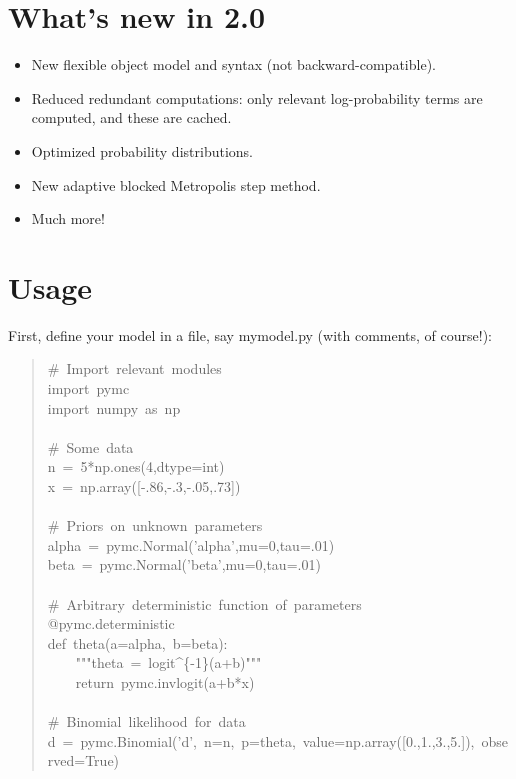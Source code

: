 
\hypertarget{what-s-new-in-2-0}{}
\section{What's new in 2.0}
\label{what-s-new-in-2-0}
\begin{itemize}
\item {} 
New flexible object model and syntax (not backward-compatible).

\item {} 
Reduced redundant computations: only relevant log-probability terms are
computed, and these are cached.

\item {} 
Optimized probability distributions.

\item {} 
New adaptive blocked Metropolis step method.

\item {} 
Much more!

\end{itemize}



\hypertarget{usage}{}
\section{Usage}
\label{usage}

First, define your model in a file, say mymodel.py (with comments, of course!):
\begin{quote}{\ttfamily \raggedright \noindent
{\#}~Import~relevant~modules~\\
import~pymc~\\
import~numpy~as~np~\\
~\\
{\#}~Some~data~\\
n~=~5*np.ones(4,dtype=int)~\\
x~=~np.array({[}-.86,-.3,-.05,.73{]})~\\
~\\
{\#}~Priors~on~unknown~parameters~\\
alpha~=~pymc.Normal('alpha',mu=0,tau=.01)~\\
beta~=~pymc.Normal('beta',mu=0,tau=.01)~\\
~\\
{\#}~Arbitrary~deterministic~function~of~parameters~\\
@pymc.deterministic~\\
def~theta(a=alpha,~b=beta):~\\
~~~~"{}"{}"theta~=~logit{\textasciicircum}{\{}-1{\}}(a+b)"{}"{}"~\\
~~~~return~pymc.invlogit(a+b*x)~\\
~\\
{\#}~Binomial~likelihood~for~data~\\
d~=~pymc.Binomial('d',~n=n,~p=theta,~value=np.array({[}0.,1.,3.,5.{]}),~observed=True)
}\end{quote}

